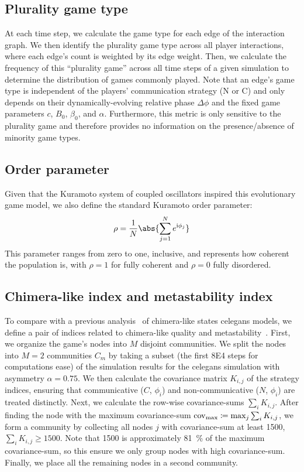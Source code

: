 \documentclass[pdflatex,lineno,referee,sn-nature]{sn-jnl}
\begin{document}
\subsection{Plurality game type}\label{sec:plurality_game_type}
At each time step, we calculate the game type for each edge
of the interaction graph.
We then identify the plurality game type across all player interactions,
where each edge's count is weighted by its edge weight.
Then, we calculate the frequency of this ``plurality game'' across
all time steps of a given simulation to determine the distribution
of games commonly played.
Note that an edge's game type is independent
of the players' communication strategy (N or C) and only depends on
their dynamically-evolving relative phase $\Delta \phi$
and the fixed game parameters $c$, $B_0$, $\beta_0$, and $\alpha$.
Furthermore, this metric is only sensitive to the
plurality game and therefore provides no information
on the presence/absence of minority game types.

\subsection{Order parameter}
Given that the Kuramoto system of coupled oscillators
inspired this evolutionary game model,
we also define the standard Kuramoto order parameter:
\begin{equation}
  \rho = \frac{1}{N} \abs{\sum_{j=1}^N e^{\im \phi_j}}
  \label{eq:order_parameter}
\end{equation}
This parameter ranges from zero to one, inclusive,
and represents how coherent the population is,
with $\rho = 1$ for fully coherent and $\rho = 0$ fully disordered.

\subsection{Chimera-like index and metastability index}\label{sec:chimera-metastability-def}
To compare with a previous analysis~\citep{hizanidis2016chimera} of
chimera-like states \gls{celegans} models,
we define a pair of indices related to
chimera-like quality and metastability~\citep{shanahan2010metastable}.
First, we organize the game's nodes
into $M$ disjoint communities.
We split the nodes into $M=2$ communities $C_m$
by taking a subset
(the first \num{8E4} steps for computations ease)
of the simulation results
for the \gls{celegans} simulation with asymmetry $\alpha = \num{0.75}$.
We then calculate the covariance matrix $K_{i,j}$ of the strategy indices,
ensuring that communicative ($C$, $\phi_i$)
and non-communicative ($N$, $\phi_i$) are treated distinctly.
Next, we calculate the row-wise covariance-sums  $\sum_i K_{i,j}$.
After finding the node with the maximum covariance-sum
$\operatorname{cov}_{\text{max}} \coloneqq \max_j{\sum_i K_{i,j}}$,
we form a community by collecting all nodes $j$ with covariance-sum
at least \num{1500}, $\sum_i K_{i,j} \ge 1500$.
Note that \num{1500} is approximately \SI{81}{\percent}
of the maximum covariance-sum,
so this ensure we only group nodes with high covariance-sum.
Finally, we place all the remaining nodes in a second community.
\end{document}
